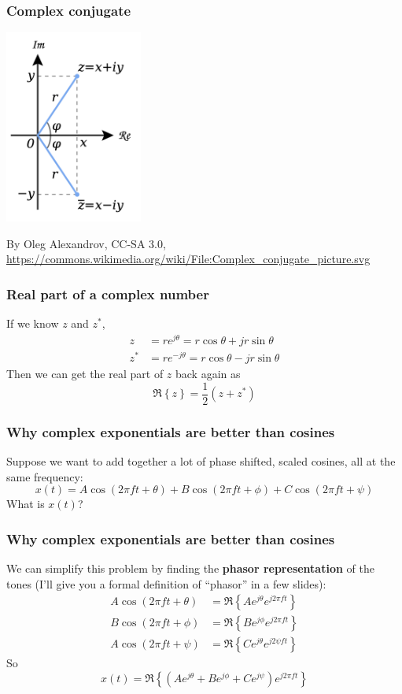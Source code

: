\documentclass{beamer}
\begin{document}
\begin{frame}
  \frametitle{Complex conjugate}

  \centerline{\includegraphics[height=2.5in]{Complex_conjugate_picture.png}}
  \begin{tiny}
    By Oleg Alexandrov, CC-SA 3.0,
    \url{https://commons.wikimedia.org/wiki/File:Complex_conjugate_picture.svg}
  \end{tiny}
\end{frame}

\begin{frame}
  \frametitle{Real part of a complex number}

  If we know $z$ and $z^*$,
  \begin{align*}
  z &= re^{j\theta} = r\cos\theta + jr\sin\theta\\
  z^* &= re^{-j\theta} = r\cos\theta - jr\sin\theta
  \end{align*}
  Then we can get the real part of $z$ back again as
  \[
  \Re\left\{z\right\} = \frac{1}{2}\left(z+z^*\right)
  \]
\end{frame}

\begin{frame}
  \frametitle{Why complex exponentials are better than cosines}

  Suppose we want to add together a lot of phase shifted, scaled
  cosines, all at the same frequency:
  \[
  x(t) = A\cos\left(2\pi ft+\theta\right)+B\cos\left(2\pi ft+\phi\right)+C\cos\left(2\pi ft+\psi\right)
  \]
  What is $x(t)$?
\end{frame}

\begin{frame}
  \frametitle{Why complex exponentials are better than cosines}

  We can simplify this problem by finding the {\bf phasor
    representation} of the tones (I'll give you a formal definition of
  ``phasor'' in a few slides):
  \begin{align*}
    A\cos\left(2\pi ft+\theta\right) &= \Re\left\{Ae^{j\theta}e^{j2\pi ft}\right\}\\
    B\cos\left(2\pi ft+\phi\right) &= \Re\left\{Be^{j\phi}e^{j2\pi ft}\right\}\\
    A\cos\left(2\pi ft+\psi\right) &= \Re\left\{Ce^{j\theta}e^{j2\psi ft}\right\}
  \end{align*}
  So
  \[
  x(t) = \Re\left\{\left(Ae^{j\theta}+Be^{j\phi}+Ce^{j\psi}\right)e^{j2\pi ft}\right\}
  \]
\end{frame}
\end{document}
